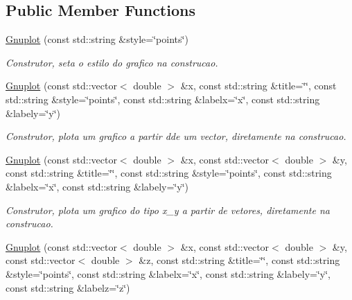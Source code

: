 \subsection*{Public Member Functions}
\begin{DoxyCompactItemize}
\item 
\hypertarget{classGnuplot_a187eb517b362cf379492fe7f1621ee50}{\hyperlink{classGnuplot_a187eb517b362cf379492fe7f1621ee50}{Gnuplot} (const std\-::string \&style=\char`\"{}points\char`\"{})}\label{classGnuplot_a187eb517b362cf379492fe7f1621ee50}

\begin{DoxyCompactList}\small\item\em Construtor, seta o estilo do grafico na construcao. \end{DoxyCompactList}\item 
\hypertarget{classGnuplot_a8ceac5808e42665c1dee305ae7ea9070}{\hyperlink{classGnuplot_a8ceac5808e42665c1dee305ae7ea9070}{Gnuplot} (const std\-::vector$<$ double $>$ \&x, const std\-::string \&title=\char`\"{}\char`\"{}, const std\-::string \&style=\char`\"{}points\char`\"{}, const std\-::string \&labelx=\char`\"{}x\char`\"{}, const std\-::string \&labely=\char`\"{}y\char`\"{})}\label{classGnuplot_a8ceac5808e42665c1dee305ae7ea9070}

\begin{DoxyCompactList}\small\item\em Construtor, plota um grafico a partir dde um vector, diretamente na construcao. \end{DoxyCompactList}\item 
\hypertarget{classGnuplot_a24327b6116c71acdc195eadf665c67cb}{\hyperlink{classGnuplot_a24327b6116c71acdc195eadf665c67cb}{Gnuplot} (const std\-::vector$<$ double $>$ \&x, const std\-::vector$<$ double $>$ \&y, const std\-::string \&title=\char`\"{}\char`\"{}, const std\-::string \&style=\char`\"{}points\char`\"{}, const std\-::string \&labelx=\char`\"{}x\char`\"{}, const std\-::string \&labely=\char`\"{}y\char`\"{})}\label{classGnuplot_a24327b6116c71acdc195eadf665c67cb}

\begin{DoxyCompactList}\small\item\em Construtor, plota um grafico do tipo x\-\_\-y a partir de vetores, diretamente na construcao. \end{DoxyCompactList}\item 
\hypertarget{classGnuplot_a14191e89154f2716608f6907975cc012}{\hyperlink{classGnuplot_a14191e89154f2716608f6907975cc012}{Gnuplot} (const std\-::vector$<$ double $>$ \&x, const std\-::vector$<$ double $>$ \&y, const std\-::vector$<$ double $>$ \&z, const std\-::string \&title=\char`\"{}\char`\"{}, const std\-::string \&style=\char`\"{}points\char`\"{}, const std\-::string \&labelx=\char`\"{}x\char`\"{}, const std\-::string \&labely=\char`\"{}y\char`\"{}, const std\-::string \&labelz=\char`\"{}z\char`\"{})}\label{classGnuplot_a14191e89154f2716608f6907975cc012}


\end{DoxyCompactItemize}
